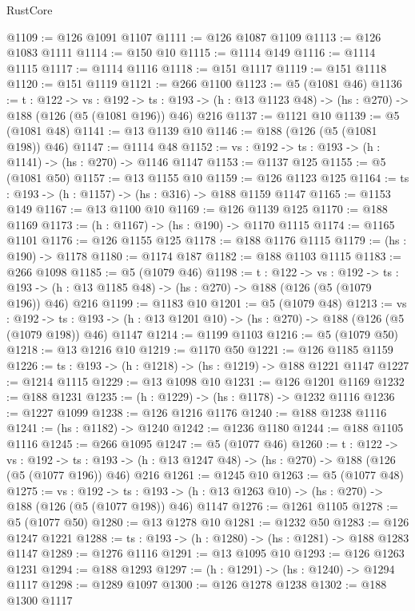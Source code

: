 \begin{lexlean}{RustCore}
\begin{coremodule}
@1109 := @126 @1091 @1107
@1111 := @126 @1087 @1109
@1113 := @126 @1083 @1111
@1114 := @150 @10
@1115 := @1114 @149
@1116 := @1114 @1115
@1117 := @1114 @1116
@1118 := @151 @1117
@1119 := @151 @1118
@1120 := @151 @1119
@1121 := @266 @1100
@1123 := @5 (@1081 @46)
@1136 := {t : @122} ->
  {vs : @192} ->
  {ts : @193} -> (h : @13 @1123 @48) -> (hs : @270) -> @188 (@126 (@5 (@1081 @196)) @46) @216
@1137 := @1121 @10
@1139 := @5 (@1081 @48)
@1141 := @13 @1139 @10
@1146 := @188 (@126 (@5 (@1081 @198)) @46)
@1147 := @1114 @48
@1152 := {vs : @192} -> {ts : @193} -> (h : @1141) -> (hs : @270) -> @1146 @1147
@1153 := @1137 @125
@1155 := @5 (@1081 @50)
@1157 := @13 @1155 @10
@1159 := @126 @1123 @125
@1164 := {ts : @193} -> (h : @1157) -> (hs : @316) -> @188 @1159 @1147
@1165 := @1153 @149
@1167 := @13 @1100 @10
@1169 := @126 @1139 @125
@1170 := @188 @1169
@1173 := (h : @1167) -> (hs : @190) -> @1170 @1115
@1174 := @1165 @1101
@1176 := @126 @1155 @125
@1178 := @188 @1176 @1115
@1179 := (hs : @190) -> @1178
@1180 := @1174 @187
@1182 := @188 @1103 @1115
@1183 := @266 @1098
@1185 := @5 (@1079 @46)
@1198 := {t : @122} ->
  {vs : @192} ->
  {ts : @193} -> (h : @13 @1185 @48) -> (hs : @270) -> @188 (@126 (@5 (@1079 @196)) @46) @216
@1199 := @1183 @10
@1201 := @5 (@1079 @48)
@1213 := {vs : @192} ->
  {ts : @193} -> (h : @13 @1201 @10) -> (hs : @270) -> @188 (@126 (@5 (@1079 @198)) @46) @1147
@1214 := @1199 @1103
@1216 := @5 (@1079 @50)
@1218 := @13 @1216 @10
@1219 := @1170 @50
@1221 := @126 @1185 @1159
@1226 := {ts : @193} -> (h : @1218) -> (hs : @1219) -> @188 @1221 @1147
@1227 := @1214 @1115
@1229 := @13 @1098 @10
@1231 := @126 @1201 @1169
@1232 := @188 @1231
@1235 := (h : @1229) -> (hs : @1178) -> @1232 @1116
@1236 := @1227 @1099
@1238 := @126 @1216 @1176
@1240 := @188 @1238 @1116
@1241 := (hs : @1182) -> @1240
@1242 := @1236 @1180
@1244 := @188 @1105 @1116
@1245 := @266 @1095
@1247 := @5 (@1077 @46)
@1260 := {t : @122} ->
  {vs : @192} ->
  {ts : @193} -> (h : @13 @1247 @48) -> (hs : @270) -> @188 (@126 (@5 (@1077 @196)) @46) @216
@1261 := @1245 @10
@1263 := @5 (@1077 @48)
@1275 := {vs : @192} ->
  {ts : @193} -> (h : @13 @1263 @10) -> (hs : @270) -> @188 (@126 (@5 (@1077 @198)) @46) @1147
@1276 := @1261 @1105
@1278 := @5 (@1077 @50)
@1280 := @13 @1278 @10
@1281 := @1232 @50
@1283 := @126 @1247 @1221
@1288 := {ts : @193} -> (h : @1280) -> (hs : @1281) -> @188 @1283 @1147
@1289 := @1276 @1116
@1291 := @13 @1095 @10
@1293 := @126 @1263 @1231
@1294 := @188 @1293
@1297 := (h : @1291) -> (hs : @1240) -> @1294 @1117
@1298 := @1289 @1097
@1300 := @126 @1278 @1238
@1302 := @188 @1300 @1117

\end{coremodule}
\end{lexlean}
